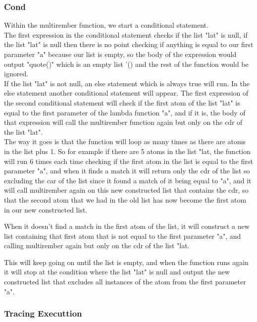 \documentclass{article}
\begin{document}
\subsubsection{Cond}
Within the multirember function, we start a conditional statement.\\

The first expression in the conditional statement checks if the list "lat" is null, if the list "lat" is null then there is no point checking if anything is equal to our first parameter "a" because our list is empty, so the body of the expression would output "quote()" which is an empty list '() and the rest of the function would be ignored.\\

If the list "lat" is not null, an else statement which is always true will run. In the else statement another conditional statement will appear.  The first expression of the second conditional statement will check if the first atom of the list "lat" is equal to the first parameter of the lambda function "a", and if it is, the body of that expression will call the multirember function again but only on the cdr of the list "lat".\\

The way it goes is that the function will loop as many times as there are atoms in the list plus 1. So for example if there are 5 atoms in the list "lat, the function will run 6 times each time checking if the first atom in the list is equal to the first parameter "a", and when it finds a match it will return only the cdr of the list so excluding the car of the list since it found a match of it being equal to "a", and it will call multirember again on this new constructed list that contains the cdr, so that the second atom that we had in the old list has now become the first atom in our new constructed list.

When it doesn't find a match in the first atom of the list, it will construct a new list containing that first atom that is not equal to the first parameter "a", and calling multirember again but only on the cdr of the list "lat.

This will keep going on until the list is empty, and when the function runs again it will stop at the condition where the list "lat" is null and output the new constructed list that excludes all instances of  the atom from the first parameter "a".

\subsubsection{Tracing Executtion}
\end{document}
